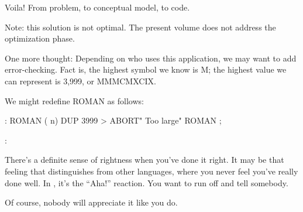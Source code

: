 Voila! From problem, to conceptual model, to code.

Note: this solution is not optimal. The present volume does not address
the optimization phase.

One more thought: Depending on who uses this application, we may
want to add error-checking. Fact is, the highest symbol we know is M; the
highest value we can represent is 3,999, or MMMCMXCIX.

\goodbreak
We might redefine ROMAN as follows:

\begin{Code}
: ROMAN  ( n)
   DUP  3999 >  ABORT" Too large"  ROMAN ;
\end{Code}

\begin{interview}
:

\begin{tfquot}
There's a definite sense of rightness when you've done it right. It may be
that feeling that distinguishes \Forth{} from other languages, where you
never feel you've really done well. In \Forth{}, it's the ``Aha!''
reaction. You want to run off and tell somebody.

Of course, nobody will appreciate it like you do.
\end{tfquot}
\end{interview}

